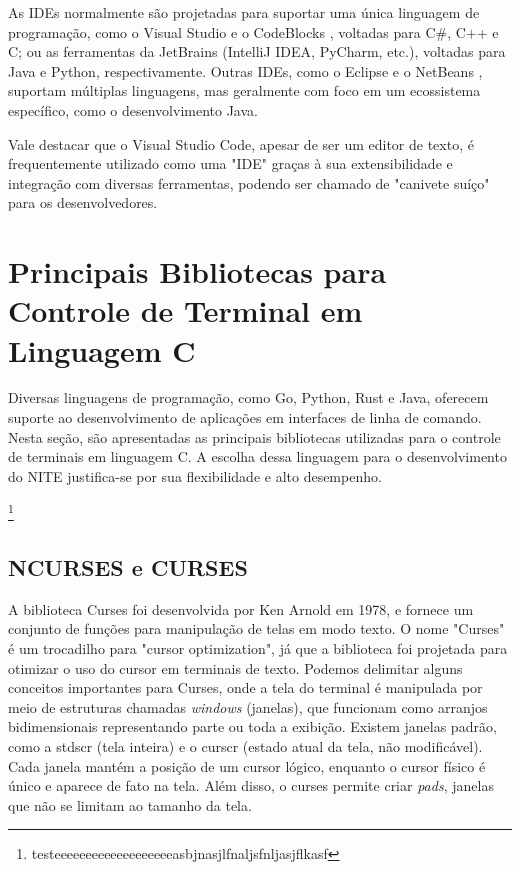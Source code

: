 As IDEs normalmente são projetadas para suportar uma única linguagem de programação, como
o Visual Studio \cite{visual_studio} e o CodeBlocks \cite{codeblocks}, voltadas para C\#, C++ e C;
ou as ferramentas da JetBrains \cite{jetbrains_tools} (IntelliJ IDEA, PyCharm, etc.),
voltadas para Java e Python, respectivamente. Outras IDEs, como o Eclipse \cite{eclipse_ide}
e o NetBeans \cite{netbeans_ide}, suportam múltiplas linguagens, mas geralmente com foco em um
ecossistema específico, como o desenvolvimento Java.

Vale destacar que o Visual Studio Code, apesar de ser um editor de texto, é frequentemente
utilizado como uma "IDE" graças à sua extensibilidade e integração com diversas
ferramentas, podendo ser chamado de "canivete suíço" para os desenvolvedores.

\section{Principais Bibliotecas para Controle de Terminal em Linguagem C}

Diversas linguagens de programação, como Go, Python, Rust e Java, oferecem suporte ao desenvolvimento
de aplicações em interfaces de linha de comando. Nesta seção, são apresentadas as principais bibliotecas
utilizadas para o controle de terminais em linguagem C. A escolha dessa linguagem para o desenvolvimento
do NITE justifica-se por sua flexibilidade e alto desempenho.

\footnote{testeeeeeeeeeeeeeeeeeeeasbjnasjlfnaljsfnljasjflkasf}

\subsection{NCURSES e CURSES}

A biblioteca Curses foi desenvolvida por Ken Arnold em 1978, e fornece um conjunto de funções
para manipulação de telas em modo texto. O nome "Curses" é um trocadilho para "cursor optimization",
já que a biblioteca foi projetada para otimizar o uso do cursor em terminais de texto. Podemos
delimitar alguns conceitos importantes para Curses, onde a tela do terminal é manipulada por meio de
estruturas chamadas \textit{windows} (janelas), que funcionam como arranjos bidimensionais representando
parte ou toda a exibição. Existem janelas padrão, como a stdscr (tela inteira) e o curscr (estado atual da tela,
não modificável). Cada janela mantém a posição de um cursor lógico, enquanto o cursor físico é único e aparece
de fato na tela. Além disso, o curses permite criar \textit{pads}, janelas que não se limitam ao tamanho da tela.
\cite{ibm_curses_aix}

